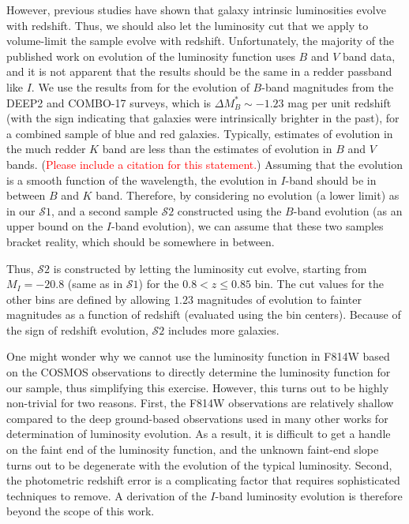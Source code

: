\documentclass[twocolumn,useAMS,usenatbib]{mn2e}
\newcommand{\rachel}[1]{{\textcolor{red}{#1}}}
\newcommand{\s}{\ensuremath{\mathcal{S}}}
\begin{document}
However, previous studies
\citep[e.g.,][]{2003A&A...401...73W,2005ApJ...622..116G,2006ApJ...647..853W,Faber2007}
have shown that galaxy intrinsic luminosities evolve with
redshift. Thus, we should also let the luminosity cut that we apply to
volume-limit the sample evolve with redshift. 
Unfortunately, the majority of the published work on evolution of the
luminosity function uses $B$ and $V$ band data, and it is not apparent
that the results should be the same in a redder passband like $I$.  
We use the results from \cite{Faber2007} for the evolution of
$B$-band magnitudes from the DEEP2 and COMBO-17 surveys, which is $
\Delta M_B^* \sim -1.23$ mag per unit redshift (with the sign
indicating that galaxies were intrinsically brighter in the past), for a combined sample
of blue and red galaxies. 
Typically, estimates of evolution in the much redder $K$ band are less
than the estimates of evolution in $B$ and $V$ bands. (\rachel{Please
  include a citation for this statement.}) 
Assuming that the evolution is a smooth function of the wavelength,
the evolution in $I$-band should be in between $B$ and $K$ band. 
Therefore, by considering no evolution (a lower limit) as in our \s$1$, and a second
sample \s$2$ constructed using the $B$-band evolution (as an upper
bound on the $I$-band evolution), we can assume that these two samples
bracket reality, which should be somewhere in between.

Thus, \s$2$ is constructed by letting the luminosity cut evolve,
starting from $M_I = -20.8$ (same as in \s$1$) for the $0.8<z\le0.85$
bin.  The cut values for the other bins are defined by allowing $1.23$
magnitudes of evolution to fainter magnitudes as a function of
redshift (evaluated using the bin centers).  Because of the sign of
redshift evolution, \s$2$ includes  more galaxies.

One might wonder why we cannot use the luminosity function in F814W
based on the COSMOS observations to directly determine the luminosity
function for our sample, thus simplifying this exercise.  However,
this turns out to be highly non-trivial for two reasons.  First, the
F814W observations are relatively shallow compared to the deep
ground-based observations used in many other works for determination
of luminosity evolution.  As a result, it is difficult to get a handle
on the faint end of the luminosity function, and the unknown faint-end
slope turns out to be degenerate with the evolution of the typical
luminosity.  Second, the photometric redshift error is a complicating
factor that requires sophisticated techniques to remove.  A derivation
of the $I$-band luminosity evolution is therefore beyond the scope of
this work.
\end{document}
